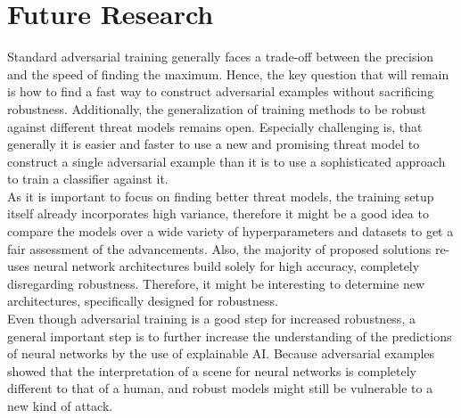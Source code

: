 \documentclass[conference]{IEEEtran}
\begin{document}

\section{Future Research}
Standard adversarial training generally faces a trade-off between the precision and the speed of finding the maximum. Hence, the key question that will remain is how to find a fast way to construct adversarial examples without sacrificing robustness. Additionally, the generalization of training methods to be robust against different threat models remains open. Especially challenging is, that generally it is easier and faster to use a new and promising threat model to construct a single adversarial example than it is to use a sophisticated approach to train a classifier against it. \\
As it is important to focus on finding better threat models, the training setup itself already incorporates high variance, therefore it might be a good idea to compare the models over a wide variety of hyperparameters and datasets to get a fair assessment of the advancements. Also, the majority of proposed solutions re-uses neural network architectures build solely for high accuracy, completely disregarding robustness. Therefore, it might be interesting to determine new architectures, specifically designed for robustness. \\
Even though adversarial training is a good step for increased robustness, a general important step is to further increase the understanding of the predictions of neural networks by the use of explainable AI. Because adversarial examples showed that the interpretation of a scene for neural networks is completely different to that of a human, and robust models might still be vulnerable to a new kind of attack.  
\end{document}
